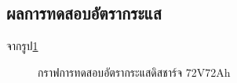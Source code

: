 \subsection{ผลการทดสอบอัตรากระแส}
จากรูป\ref{fig:C_rate_Test}
\begin{center}
	\begin{figure}[H]
		\centering
		\captionsetup{justification=centering,margin=2cm}
		\caption{กราฟการทดสอบอัตรากระแสดิสชาร์จ 72V72Ah}
		\label{fig:C_rate_Test}
	\end{figure}
	
\end{center}






















